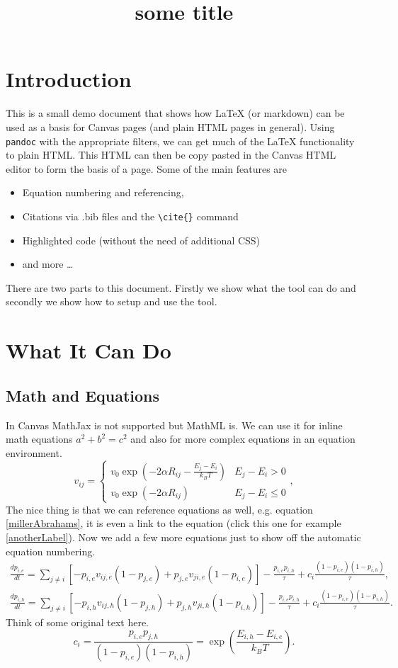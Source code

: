 \documentclass[11pt, a4paper]{article}
\title{some title}
\begin{document}
	
	\section{Introduction}
	This is a small demo document that shows how LaTeX (or markdown) can be used as a basis for Canvas pages (and plain HTML pages in general). Using \lstinline|pandoc| with the appropriate filters, we can get much of the LaTeX functionality to plain HTML. This HTML can then be copy pasted in the Canvas HTML editor to form the basis of a page. Some of the main features are
	\begin{itemize}
		\item Equation numbering and referencing,
		\item Citations via .bib files and the \lstinline|\cite{}| command
		\item Highlighted code (without the need of additional CSS)
		\item and more \ldots
	\end{itemize}
	
	\noindent
	There are two parts to this document. Firstly we show what the tool can do and secondly we show how to setup and use the tool.
	
	\section{What It Can Do}
	
	\subsection{Math and Equations}
	In Canvas MathJax is not supported but MathML is. We can use it for inline math equations $a^2+b^2 = c^2$ and also for more complex equations in an equation environment.
	\begin{equation}
	v_{ij}=
	\begin{cases} 
	v_0 \exp(-2\alpha R_{ij} - \frac{E_j - E_i}{k_B T}) &  E_j-E_i > 0\\
	v_0 \exp(-2\alpha R_{ij}) & E_j-E_i \leq 0
	\end{cases}, \label{millerAbrahams}
	\end{equation}
	The nice thing is that we can reference equations as well, e.g. equation \ref{millerAbrahams}, it is even a link to the equation (click this one for example \ref{anotherLabel}). Now we add a few more equations just to show off the automatic equation numbering.
	\begin{align}
	\frac{dp_{i,e}}{dt} = \sum_{j\neq i} \left[ -p_{i,e} v_{ij,e} (1-p_{j,e}) + p_{j,e} v_{ji,e}  (1-p_{i,e}) \right] - \frac{p_{i,e}p_{i,h}}{\tau} + c_i\frac{(1-p_{i,e})(1-p_{i,h})}{\tau}, \label{eq:electronME} \\
	\frac{dp_{i,h}}{dt} = \sum_{j\neq i} \left[ -p_{i,h} v_{ij,h} (1-p_{j,h}) + p_{j,h} v_{ji,h}  (1-p_{i,h}) \right] - \frac{p_{i,e}p_{i,h}}{\tau} + c_i\frac{(1-p_{i,e})(1-p_{i,h})}{\tau}.
	\end{align}
	Think of some original text here.
	\begin{equation}
	c_i = \frac{p_{i,e}p_{j,h}}{(1-p_{i,e})(1-p_{i,h})} = \exp\left(\frac{E_{i,h} - E_{i,e}}{k_B T}\right). \label{anotherLabel}
	\end{equation}
	
\end{document}

